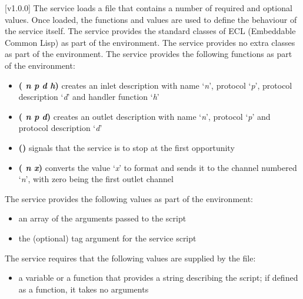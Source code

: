 [v1.0.0]
The \CLF{} service loads a \CL{} file that contains a number of required and optional
values.
Once loaded, the \CL{} functions and values are used to define the behaviour of the
service itself.
The \CLF{} service provides the standard classes of ECL (Embeddable Common Lisp) as part
of the \CL{} environment.
\secondaryEnd
{}
The \CLF{} service provides no extra classes as part of the \CL{} environment.
\secondaryEnd
{}
The \CLF{} service provides the following functions as part of the \CL{} environment:
\begin{itemize}
\item\textbf{( \textit{n} \textit{p} \textit{d} \textit{h})}
\longDash{} creates an inlet description with name `\textit{n}', protocol `\textit{p}',
protocol description `\textit{d}' and handler function `\textit{h}'
\item\exSp\textbf{( \textit{n} \textit{p} \textit{d})}
\longDash{} creates an outlet description with name `\textit{n}', protocol `\textit{p}'
and protocol description `\textit{d}' 
\item\exSp\textbf{()} \longDash{} signals that the service is to stop
at the first opportunity
\item\exSp\textbf{( \textit{n} \textit{x})} \longDash{} converts the
value `\textit{x}' to \yarp{} format and sends it to the channel numbered `\textit{n}',
with zero being the first outlet channel
\end{itemize}
\secondaryEnd
{}
The \CLF{} service provides the following values as part of the \CL{} environment:
\begin{itemize}
\item\exSp\textbf{} \longDash{} an array of the arguments passed to the
script
\item\exSp\textbf{} \longDash{} the (optional) tag argument for the service
script
\end{itemize}
\secondaryEnd
{}
The \CLF{} service requires that the following values are supplied by the \CL{} file:
\begin{itemize}
\item\textbf{} \longDash{} a variable or a function that
provides a string describing the script; if defined as a function, it takes no arguments
\end{itemize}

